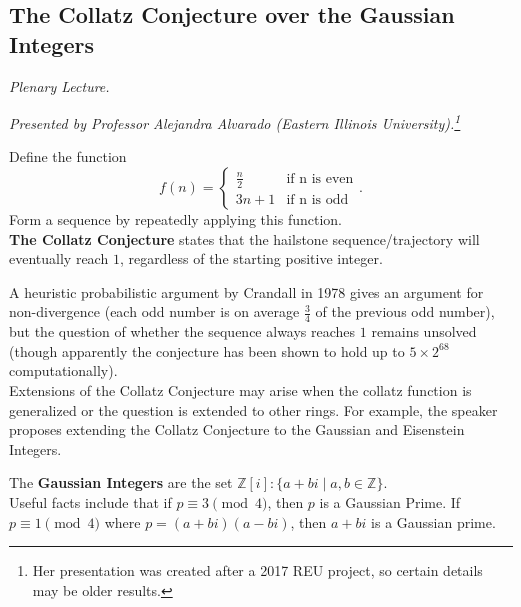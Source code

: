 \documentclass[12pt]{amsart}
\begin{document}
\newpage

\subsection{The Collatz Conjecture over the Gaussian Integers}

\textit{Plenary Lecture.}
\vspace{0.25cm}

\textit{Presented by Professor Alejandra Alvarado (Eastern Illinois University).\footnote{Her presentation was created after a 2017 REU project, so certain details may be older results.}}

\begin{definition}
Define the function \[ f(n) = \begin{cases}\frac{n}{2} & \text{if n is even} \\ 3n + 1 & \text{if n is odd} \end{cases}.\]
Form a sequence by repeatedly applying this function. \\

\textbf{The Collatz Conjecture} states that the hailstone sequence/trajectory will eventually reach $1$, regardless of the starting positive integer.
\end{definition}

\vspace{0.25cm}

A heuristic probabilistic argument by Crandall in 1978 gives an argument for non-divergence (each odd number is on average $\frac{3}{4}$ of the previous odd number), but the question of whether the sequence always reaches $1$ remains unsolved (though apparently the conjecture has been shown to hold up to $5 \times 2^{68}$ computationally). \\

Extensions of the Collatz Conjecture may arise when the collatz function is generalized or the question is extended to other rings. For example, the speaker proposes extending the Collatz Conjecture to the Gaussian and Eisenstein Integers.

\begin{definition}
The \textbf{Gaussian Integers} are the set $\mathbb{Z}[i] : \{ a + bi \mid a, b \in \mathbb{Z} \}.$ \\
    
Useful facts include that if $p \equiv 3 \pmod 4$, then $p$ is a Gaussian Prime. If $p \equiv 1 \pmod 4$ where $p = (a+bi)(a-bi)$, then $a+bi$ is a Gaussian prime.
\end{definition}
\end{document}
